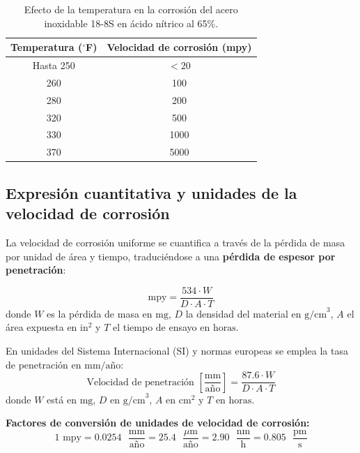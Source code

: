 \begin{table}[H]
    \centering
    \caption{Efecto de la temperatura en la corrosión del acero inoxidable 18-8S en ácido nítrico al 65\%.}
    \begin{tabular}{cc}
        \toprule
        \textbf{Temperatura ($^\circ$F)} & \textbf{Velocidad de corrosión (mpy)} \\
        \midrule
        Hasta 250 & $< 20$ \\
        260 & 100 \\
        280 & 200 \\
        320 & 500 \\
        330 & 1000 \\
        370 & 5000 \\
        \bottomrule
    \end{tabular}
    \label{tab:efecto_temp_hno3}
\end{table}

\subsection{Expresión cuantitativa y unidades de la velocidad de corrosión}
La velocidad de corrosión uniforme se cuantifica a través de la pérdida de masa por unidad de área y tiempo, traduciéndose a una \textbf{pérdida de espesor por penetración}:

\begin{equation}
    \text{mpy} = \frac{534 \cdot W}{D \cdot A \cdot T}
    \label{eq:mpy_formula}
\end{equation}
donde $W$ es la pérdida de masa en $\text{mg}$, $D$ la densidad del material en $\text{g/cm}^3$, $A$ el área expuesta en $\text{in}^2$ y $T$ el tiempo de ensayo en $\text{horas}$.

En unidades del Sistema Internacional (SI) y normas europeas se emplea la tasa de penetración en $\text{mm/año}$:
\begin{equation}
    \text{Velocidad de penetración } \left[\frac{\text{mm}}{\text{año}}\right] = \frac{87.6 \cdot W}{D \cdot A \cdot T}
    \label{eq:mm_year_formula}
\end{equation}
donde $W$ está en $\text{mg}$, $D$ en $\text{g/cm}^3$, $A$ en $\text{cm}^2$ y $T$ en $\text{horas}$.

\textbf{Factores de conversión de unidades de velocidad de corrosión:}
\begin{equation}
    1\text{ mpy} = 0.0254\text{ }\frac{\text{mm}}{\text{año}} = 25.4\text{ }\frac{\mu\text{m}}{\text{año}} = 2.90\text{ }\frac{\text{nm}}{\text{h}} = 0.805\text{ }\frac{\text{pm}}{\text{s}}
    \label{eq:conversion_corrosion}
\end{equation}

